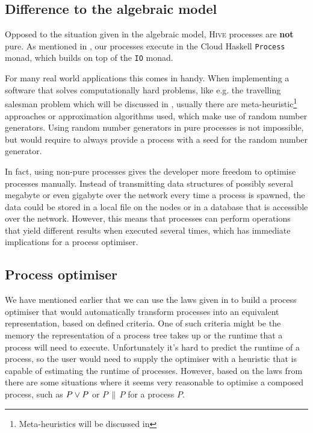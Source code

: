 \subsection{Difference to the algebraic model}
\label{chp:difference_model_implementation}
Opposed to the situation given in the algebraic model, \textsc{Hive} processes are \textbf{not} pure. As mentioned in , our processes execute in the \textsf{Cloud Haskell} \texttt{Process} monad, which builds on top of the \texttt{IO} monad.

For many real world applications this comes in handy. When implementing a software that solves computationally hard problems, like e.g. the travelling salesman problem which will be discussed in , usually there are meta-heuristic\footnote{Meta-heuristics will be discussed in } approaches or approximation algorithms \cite{rolf2006approximationsalgorithmen} used, which make use of random number generators. Using random number generators in pure processes is not impossible, but would require to always provide a process with a seed for the random number generator.

In fact, using non-pure processes gives the developer more freedom to optimise processes manually. Instead of transmitting data structures of possibly several megabyte or even gigabyte over the network every time a process is spawned, the data could be stored in a local file on the nodes or in a database that is accessible over the network. However, this means that processes can perform operations that yield different results when executed several times, which has immediate implications for a process optimiser.

\subsection{Process optimiser}
We have mentioned earlier that we can use the laws given in  to build a process optimiser that would automatically transform processes into an equivalent representation, based on defined criteria. One of such criteria might be the memory the representation of a process tree takes up or the runtime that a process will need to execute. Unfortunately it's hard to predict the runtime of a process, so the user would need to supply the optimiser with a heuristic that is capable of estimating the runtime of processes. However, based on the laws from  there are some situations where it seems very reasonable to optimise a composed process, such as $P \vee P$ or $P \,\parallel\, P$ for a process $P$.

